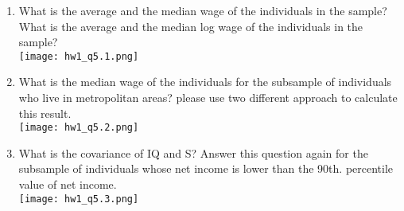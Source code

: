 \documentclass[12pt]{article}%
\begin{document}
\pagebreak
\begin{enumerate}
    \item What is the average and the median wage of the individuals in the sample? What is the average and the median log wage of the individuals in the sample?\\
    \texttt{[image: hw1\_q5.1.png]}\\
    \item What is the median wage of the individuals for the subsample of individuals who live in metropolitan areas? please use two different approach to calculate this result.\\
    \texttt{[image: hw1\_q5.2.png]}\\
    \item What is the covariance of IQ and S? Answer this question again for the subsample of individuals whose net income is lower than the 90th. percentile value of net income.\\
    \texttt{[image: hw1\_q5.3.png]}
\end{enumerate}
\end{document}
